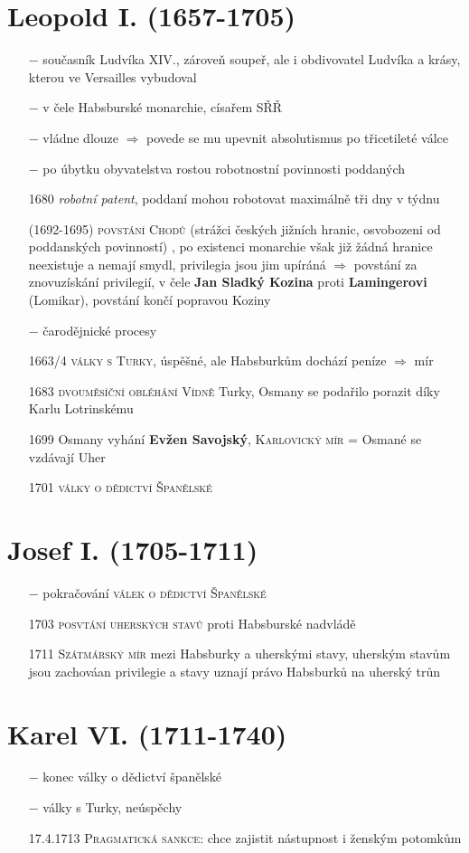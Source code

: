 \documentclass{article}
\begin{document}
\section*{Leopold I. (1657-1705)}
\begin{itemize}
    \vspace{-0.5em}
    \setlength\itemsep{0.15em}
    \item[$-$] současník Ludvíka XIV., zároveň soupeř, ale i obdivovatel Ludvíka a krásy, kterou ve Versailles vybudoval
    \item[$-$] v čele Habsburské monarchie, císařem SŘŘ
    \item[$-$] vládne dlouze $\Rightarrow$ povede se mu upevnit absolutismus po třicetileté válce
    \item[$-$] po úbytku obyvatelstva rostou robotnostní povinnosti poddaných
    \item[1680] \textit{robotní patent}, poddaní mohou robotovat maximálně tři dny v týdnu
    \item[(1692-1695)] \textsc{povstání Chodů} (strážci českých jižních hranic, osvobozeni od poddanských povinností) , po existenci monarchie však již žádná hranice neexistuje a nemají smydl, privilegia jsou jim upíráná $\Rightarrow$ povstání za znovuzískání privilegií, v čele \textbf{Jan Sladký Kozina} proti \textbf{Lamingerovi} (Lomikar), povstání končí popravou Koziny
    \item[$-$] čarodějnické procesy
    \item[1663/4] \textsc{války s Turky}, úspěšné, ale Habsburkům dochází peníze $\Rightarrow$ mír
    \item[1683]  \textsc{dvouměsíční obléhání Vídně} Turky, Osmany se podařilo porazit díky Karlu Lotrinskému
    \item[1699] Osmany vyhání \textbf{Evžen Savojský}, \textsc{Karlovický mír} = Osmané se vzdávají Uher
    \item[1701] \textsc{války o dědictví Španělské}
\end{itemize}


\section*{Josef I. (1705-1711)}
\begin{itemize}
    \vspace{-0.5em}
    \setlength\itemsep{0.15em}
    \item[$-$] pokračování \textsc{válek o dědictví Španělské}
    \item[1703] \textsc{posvtání uherských stavů} proti Habsburské nadvládě
    \item[1711] \textsc{Szátmárský mír} mezi Habsburky a uherskými stavy, uherským stavům jsou zachováan privilegie a stavy uznají právo Habsburků na uherský trůn
\end{itemize}

\section*{Karel VI. (1711-1740)}
\begin{itemize}
    \vspace{-0.5em}
    \setlength\itemsep{0.15em}
    \item[$-$] konec války o dědictví španělské
    \item[$-$] války s Turky, neúspěchy
    \item[17.4.1713] \textsc{Pragmatická sankce}: chce zajistit nástupnost i ženským potomkům
\end{itemize}
\end{document}
